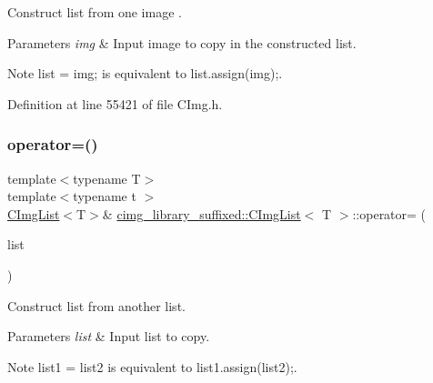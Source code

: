 Construct list from one image . 


\begin{DoxyParams}{Parameters}
{\em img} & Input image to copy in the constructed list. \\
\hline
\end{DoxyParams}
\begin{DoxyNote}{Note}
{\ttfamily list = img;} is equivalent to {\ttfamily list.\+assign(img);}. 
\end{DoxyNote}


Definition at line 55421 of file C\+Img.\+h.

\mbox{\label{structcimg__library__suffixed_1_1CImgList_afbb9a219763c398164f16f8d422b22e8}} 
\subsubsection{\texorpdfstring{operator=()}{operator=()}\hspace{0.1cm}{\footnotesize\ttfamily [2/4]}}
{\footnotesize\ttfamily template$<$typename T$>$ \\
template$<$typename t $>$ \\
\hyperlink{structcimg__library__suffixed_1_1CImgList}{C\+Img\+List}$<$T$>$\& \hyperlink{structcimg__library__suffixed_1_1CImgList}{cimg\+\_\+library\+\_\+suffixed\+::\+C\+Img\+List}$<$ T $>$\+::operator= (\begin{DoxyParamCaption}\item[{const \hyperlink{structcimg__library__suffixed_1_1CImgList}{C\+Img\+List}$<$ t $>$ \&}]{list }\end{DoxyParamCaption})\hspace{0.3cm}{\ttfamily [inline]}}



Construct list from another list. 


\begin{DoxyParams}{Parameters}
{\em list} & Input list to copy. \\
\hline
\end{DoxyParams}
\begin{DoxyNote}{Note}
{\ttfamily list1 = list2} is equivalent to {\ttfamily list1.\+assign(list2);}. 
\end{DoxyNote}


